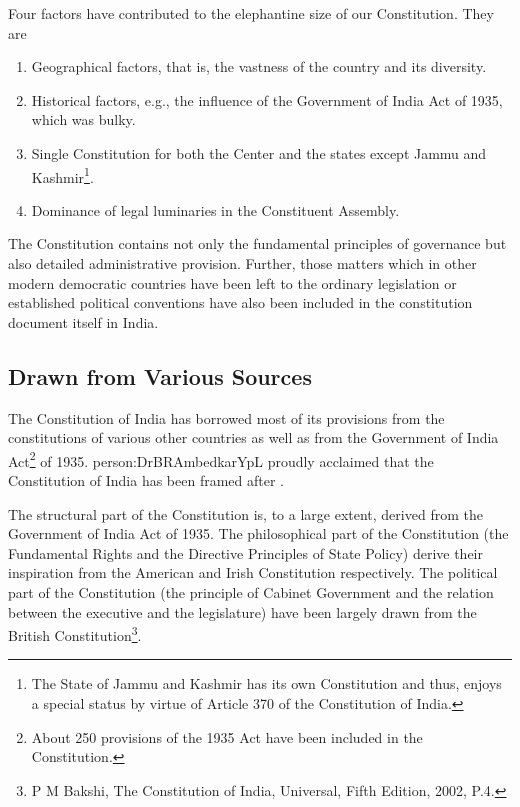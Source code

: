 Four factors have contributed to the elephantine size of our Constitution. They are

\renewcommand{\labelenumi}{\textbf{(\alph{enumi})}}
\begin{enumerate}
  \item Geographical factors, that is, the vastness of the country and its diversity.
  \item Historical factors, e.g., the influence of the Government of India Act of 1935, which was bulky.
  \item Single Constitution for both the Center and the states except Jammu and Kashmir\footnote{The State of Jammu and Kashmir has its own Constitution and thus, enjoys a special status by virtue of Article 370 of the Constitution of India.}.
  \item Dominance of legal luminaries in the Constituent Assembly.
\end{enumerate}

The Constitution contains not only the fundamental principles of governance but also detailed administrative provision. Further, those matters which in other modern democratic countries have been left to the ordinary legislation or established political conventions have also been included in the constitution document itself in India.

\subsection{Drawn from Various Sources}

The Constitution of India has borrowed most of its provisions from the constitutions of various other countries as well as from the Government of India Act\footnote{About 250 provisions of the 1935 Act have been included in the Constitution.} of 1935. \gls{person:DrBRAmbedkarYpL} proudly acclaimed that the Constitution of India has been framed after .

The structural part of the Constitution is, to a large extent, derived from the Government of India Act of 1935. The philosophical part of the Constitution (the Fundamental Rights and the Directive Principles of State Policy) derive their inspiration from the American and Irish Constitution respectively. The political part of the Constitution (the principle of Cabinet Government and the relation between the executive and the legislature) have been largely drawn from the British Constitution\footnote{P M Bakshi, The Constitution of India, Universal, Fifth Edition, 2002, P.4.}.

